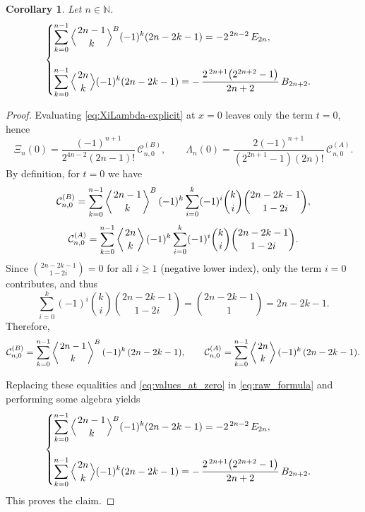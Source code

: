 \documentclass[11pt,twoside]{article}
\newtheorem{corollary}[theorem]{Corollary}
\numberwithin{equation}{section}
\begin{document}
\begin{corollary}
Let \(n\in \mathbb{N}\).
\[
\begin{cases}
\displaystyle\sum_{k=0}^{n-1}\Big\langle {2n-1 \atop k}\Big\rangle^{B}(-1)^k(2n-2k-1) = -2^{\,2n-2}\,E_{2n},
\\
\hspace{0.1cm}\\
\displaystyle\sum_{k=0}^{n-1}\Big\langle {2n \atop k}\Big\rangle(-1)^k(2n-2k-1) = -\,\dfrac{2^{\,2n+1}\bigl(2^{2n+2}-1\bigr)}{2n+2}\,B_{2n+2}.
\end{cases}\]
\end{corollary}

\begin{proof}
Evaluating \eqref{eq:XiLambda-explicit} at $x=0$ leaves only the term $t=0$, hence
\begin{equation}
\Xi_n(0)=\frac{(-1)^{n+1}}{2^{4n-2}(2n-1)!}\,\mathcal C^{(B)}_{n,0},
\qquad
\Lambda_n(0)=\frac{2(-1)^{n+1}}{(2^{2n+1}-1)(2n)!}\,\mathcal C^{(A)}_{n,0}.
\label{eq:raw_formula}
\end{equation}
By definition, for $t=0$ we have
\[
\mathcal C^{(B)}_{n,0}
=
\sum_{k=0}^{n-1}\left\langle {2n-1 \atop k}\right\rangle^{B}(-1)^{k}
\sum_{i=0}^{k}(-1)^i\binom{k}{i}\binom{2n-2k-1}{\,1-2i\,},
\]
\[
\mathcal C^{(A)}_{n,0}
=
\sum_{k=0}^{n-1}\left\langle {2n \atop k}\right\rangle(-1)^{k}
\sum_{i=0}^{k}(-1)^i\binom{k}{i}\binom{2n-2k-1}{\,1-2i\,}.
\]
Since $\displaystyle\binom{2n-2k-1}{\,1-2i\,}=0$ for all $i\ge 1$ (negative lower index), only the term $i=0$ contributes, and thus
\[
\sum_{i=0}^{k}(-1)^i\binom{k}{i}\binom{2n-2k-1}{\,1-2i\,}
=\binom{2n-2k-1}{1}=2n-2k-1.
\]
Therefore,
\[
\mathcal C^{(B)}_{n,0}
=
\sum_{k=0}^{n-1}\left\langle {2n-1 \atop k}\right\rangle^{B}(-1)^{k}\,(2n-2k-1),
\qquad
\mathcal C^{(A)}_{n,0}
=
\sum_{k=0}^{n-1}\left\langle {2n \atop k}\right\rangle(-1)^{k}\,(2n-2k-1).
\]

Replacing these equalities and \eqref{eq:values_at_zero} in \eqref{eq:raw_formula} and performing some algebra yields
\[
\begin{cases}
\displaystyle\sum_{k=0}^{n-1}\Big\langle {2n-1 \atop k}\Big\rangle^{B}(-1)^k(2n-2k-1) = -2^{\,2n-2}\,E_{2n},
\\
\hspace{0.1cm}\\
\displaystyle\sum_{k=0}^{n-1}\Big\langle {2n \atop k}\Big\rangle(-1)^k(2n-2k-1) = -\,\dfrac{2^{\,2n+1}\bigl(2^{2n+2}-1\bigr)}{2n+2}\,B_{2n+2}.
\end{cases}\]
This proves the claim.
\end{proof}
\end{document}

